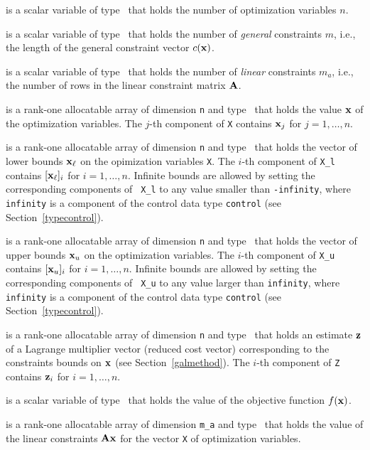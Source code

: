 \documentclass{galahad}
\begin{document}
\begin{description}

 is a scalar variable of type \integer\ 
 that holds the number of optimization variables $n$.

 is a scalar variable of type \integer\
 that holds the number of {\em general} constraints $m$, i.e., the length
 of the general constraint vector $c({\mathbf{x}})$.

 is a scalar variable of type \integer\ 
 that holds the number of {\em linear} constraints $m_a$, i.e., the number
 of rows in the linear constraint matrix ${\mathbf{A}}$.

\ittf{X} is a rank-one allocatable array of dimension {\tt n} and type 
\realdp\ that holds the value ${\mathbf{x}}$ of the optimization variables.
The $j$-th component of {\tt X} contains
${\mathbf{x}}_{j}$ for $j = 1,  \ldots , n$.

\ittf{X\_l} is a rank-one allocatable array of dimension {\tt n}
and type \realdp\ that holds the vector of lower bounds
${\mathbf{x}}_\ell$ on the opimization variables {\tt X}. The $i$-th component of
{\tt X\_l} contains $[{\mathbf{x}}_\ell]_i$ for $i = 1, \ldots , n$.  Infinite
bounds are allowed by setting the corresponding components of {\tt
  X\_l} to any value smaller than {\tt -infinity}, where {\tt
  infinity} is a component of the control data type {\tt control} (see
Section~\ref{typecontrol}).

\ittf{X\_u}  is a rank-one allocatable array of dimension {\tt n}
and type \realdp\ that holds the vector of upper bounds
${\mathbf{x}}_u$ on the optimization variables.  The $i$-th component of
{\tt X\_u} contains $[{\mathbf{x}}_u]_i$ for $i = 1, \ldots , n$.  Infinite
bounds are allowed by setting the corresponding components of {\tt
  X\_u} to any value larger than {\tt infinity}, where {\tt
  infinity} is a component of the control data type {\tt control} (see
Section~\ref{typecontrol}).

\ittf{Z} is a rank-one allocatable array of dimension {\tt n} and type 
\realdp\ that holds an estimate ${\mathbf{z}}$ of a Lagrange
multiplier vector (reduced cost vector) corresponding to the
constraints bounds on ${\mathbf{x}}$ (see Section~\ref{galmethod}).
The $i$-th component of {\tt Z} contains ${\mathbf{z}}_{i}$ for $i = 1,
\ldots , n$.

\ittf{X\_status}

 is a scalar variable of type 
\realdp\ that holds the value of the objective function $f({\mathbf{x}})$.

\ittf{Ax} is a rank-one allocatable array of dimension {\tt m\_a}
and type \realdp\ that holds the value of the linear
constraints ${\mathbf{A}}{\mathbf{x}}$ for the vector {\tt X} of optimization variables.   


\end{description}
\end{document}
